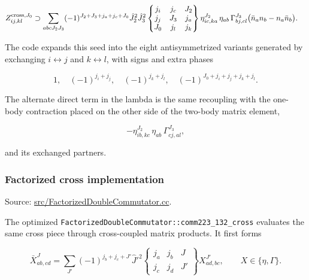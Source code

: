 \documentclass[
]{article}
\begin{document}
\begin{equation}
\begin{aligned}
Z^{{\rm cross},J_0}_{ij,kl}
&\supset \sum_{abcJ_2J_3}
(-1)^{J_2+J_3+j_a+j_c+J_0}
\hat J_2^2\hat J_3^2
\begin{Bmatrix}
j_i&j_c&J_2\\
j_j&J_3&j_a\\
J_0&j_l&j_k
\end{Bmatrix}
\eta^{J_2}_{ic,ka}\,\eta_{ab}\,\Gamma^{J_3}_{bj,cl}
\big(\bar n_a n_b-n_a\bar n_b\big).
\end{aligned}
\end{equation}

The code expands this seed into the eight antisymmetrized variants
generated by exchanging \(i\leftrightarrow j\) and
\(k\leftrightarrow l\), with signs and extra phases

\begin{equation}
1,
\quad (-1)^{j_i+j_j},
\quad (-1)^{j_k+j_l},
\quad (-1)^{J_0+j_i+j_j+j_k+j_l}.
\end{equation}

The alternate direct term in the lambda is the same recoupling with the
one-body contraction placed on the other side of the two-body matrix
element,

\begin{equation}
-\eta^{J_2}_{ib,kc}\,\eta_{ab}\,\Gamma^{J_3}_{cj,al},
\end{equation}

and its exchanged partners.

\subsubsection{Factorized cross
implementation}\label{factorized-cross-implementation}

Source:
\href{../src/FactorizedDoubleCommutator.cc\#L3287-L3565}{src/FactorizedDoubleCommutator.cc}.

The optimized \texttt{FactorizedDoubleCommutator::comm223\_132\_cross}
evaluates the same cross piece through cross-coupled matrix products. It
first forms

\begin{equation}
\bar X^J_{ab,cd}
=\sum_{J'}(-1)^{j_b+j_c+J'}\hat J'^2
\begin{Bmatrix} j_a&j_b&J\\ j_c&j_d&J'\end{Bmatrix}
X^{J'}_{ad,bc},
\qquad X\in\{\eta,\Gamma\}.
\end{equation}
\end{document}
